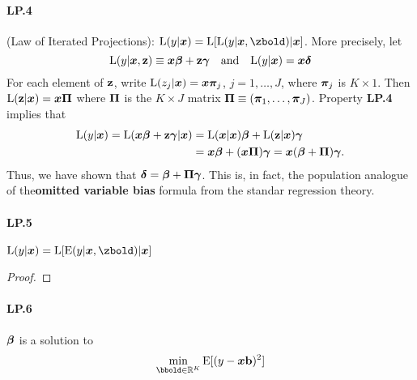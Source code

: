 \documentclass[11pt, oneside, a4paper, article]{article}
\numberwithin{equation}{section}
\begin{document}
\paragraph{LP.4} (Law of Iterated Projections):
$\L(y | \xvec) = \L[ \L( y | \xvec, \zbold ) | \xvec]$.
More precisely, let
\begin{equation}
	\text{L}(y | \boldsymbol{x}, \mathbf{z}) \equiv \boldsymbol{x} \boldsymbol{\beta} + \mathbf{z} \boldsymbol{\gamma}
	\quad \text{and} \quad
	\text{L}(y | \boldsymbol{x}) = \boldsymbol{x} \boldsymbol{\delta}
\end{equation}
%
For each element of $\mathbf{z}$, write
$\text{L}(z_{j} | \boldsymbol{x}) = \boldsymbol{x} \boldsymbol{\pi}_{j}$, $j=1, \dots, J$, where $\boldsymbol{\pi}_{j}$ is $K \times 1$.
Then $\text{L}(\mathbf{z} | \boldsymbol{x}) = \boldsymbol{x} \boldsymbol{\Pi}$ where $\boldsymbol{\Pi}$ is the $K \times J$ matrix
$\boldsymbol{\Pi} \equiv (\boldsymbol{\pi}_{1}, \dots, \boldsymbol{\pi}_{J})$. 
%
Property \textbf{LP.4} implies that
%
\begin{align} \notag
	\text{L}(y | \boldsymbol{x}) = \text{L}( \boldsymbol{x} \boldsymbol{\beta} + \mathbf{z} \boldsymbol{\gamma} | \boldsymbol{x}) 
	&= \text{L}(\boldsymbol{x} | \boldsymbol{x}) \boldsymbol{\beta} + \text{L}(\mathbf{z} | \boldsymbol{x}) \boldsymbol{\gamma}
	\\ \label{eq:2.50}
	&= \boldsymbol{x} \boldsymbol{\beta} + (\boldsymbol{x} \boldsymbol{\Pi}) \boldsymbol{\gamma} = \boldsymbol{x} ( \boldsymbol{\beta} + \boldsymbol{\Pi} ) \boldsymbol{\gamma}.
\end{align}
Thus, we have shown that $\boldsymbol{\delta} = \boldsymbol{\beta} + \boldsymbol{\Pi} \boldsymbol{\gamma}$.
This is, in fact, the population analogue of the\textbf{omitted variable bias} formula from the standar regression theory.

\paragraph{LP.5} 
$\L(y | \xvec) = \L[ \E( y | \xvec, \zbold ) | \xvec ]$

\begin{proof}
\end{proof}

\paragraph{LP.6}
$\boldsymbol{\beta}$ is a solution to 
\begin{equation} \label{eq:2.51}
	\min_{\bbold \in \R^{K}}
	\E [(y - \xvec \bvec)^2]
\end{equation}
\end{document}
